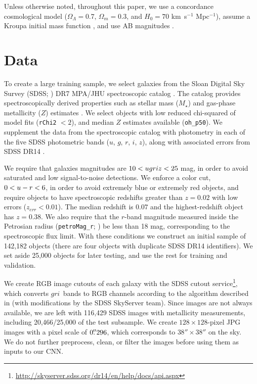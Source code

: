 \documentclass[fleqn,usenatbib]{mnras}
\newcommand{\sdssu}{\hbox{$u$}}
\newcommand{\sdssg}{\hbox{$g$}}
\newcommand{\sdssr}{\hbox{$r$}}
\newcommand{\sdssi}{\hbox{$i$}}
\newcommand{\sdssz}{\hbox{$z$}}
\newcommand{\mstar}{\hbox{$M_{\star}$}}
\newcommand{\kms}{\hbox{km~s$^{-1}$}}
\newcommand{\permpc}{\hbox{Mpc$^{-1}$}}
\begin{document}
Unless otherwise noted, throughout this paper, we use a concordance cosmological model ($\Omega_\Lambda = 0.7$, $\Omega_m = 0.3$, and $H_0= 70$ \kms{} \permpc), assume a Kroupa initial mass function \citep{Kroupa2001}, and use AB magnitudes \citep{Oke1974}.

\section{Data} \label{sec:data}
To create a large training sample, we select galaxies from the Sloan Digital Sky Survey (SDSS; \citealt{York2000}) DR7 MPA/JHU spectroscopic catalog \citep{Kauffmann2003a, Brinchmann2004, Tremonti2004, Salim2007}. The catalog provides spectroscopically derived properties such as stellar mass (\mstar) and gas-phase metallicity ($Z$) estimates \citep{Tremonti2004}. We select objects with low reduced chi-squared of model fits (\texttt{rChi2} $< 2$), and median $Z$ estimates available (\texttt{oh\_p50}). We supplement the data from the spectroscopic catalog with photometry in each of the five SDSS photometric bands (\sdssu, \sdssg, \sdssr, \sdssi, \sdssz), along with associated errors from SDSS DR14 \citep{Abolfathi2017}.

We require that galaxies magnitudes are $10 < \sdssu \sdssg \sdssr \sdssi \sdssz < 25$ mag, in order to avoid saturated and low signal-to-noise detections. We enforce a color cut, $0 < \sdssu-\sdssr < 6$, in order to avoid extremely blue or extremely red objects, and require objects to have spectroscopic redshifts greater than $z=0.02$ with low errors ($z_{err} < 0.01$). The median redshift is $0.07$ and the highest-redshift object has $z = 0.38$. We also require that the \sdssr-band magnitude measured inside the Petrosian radius (\texttt{petroMag\_r}; \citealt{Petrosian1976}) be less than 18 mag, corresponding to the spectroscopic flux limit. With these conditions we construct an initial sample of 142,182 objects (there are four objects with duplicate SDSS DR14 identifiers).
We set aside 25,000 objects for later testing, and use the rest for training and validation.

We create RGB image cutouts of each galaxy with the SDSS cutout service\footnote{\url{http://skyserver.sdss.org/dr14/en/help/docs/api.aspx}}, which converts \sdssg\sdssr\sdssi\ bands to RGB channels according to the algorithm described in \cite{Lupton2004} (with modifications by the SDSS SkyServer team). Since images are not always available, we are left with 116,429 SDSS images with metallicity measurements, including 20,466/25,000 of the test subsample. We create $128\times128$-pixel JPG images with a pixel scale of $0\hbox{$.\!\!^{\prime\prime}$}296$, which corresponds to $38''\times 38''$ on the sky.  We do not further preprocess, clean, or filter the images before using them as inputs to our CNN.
\end{document}
